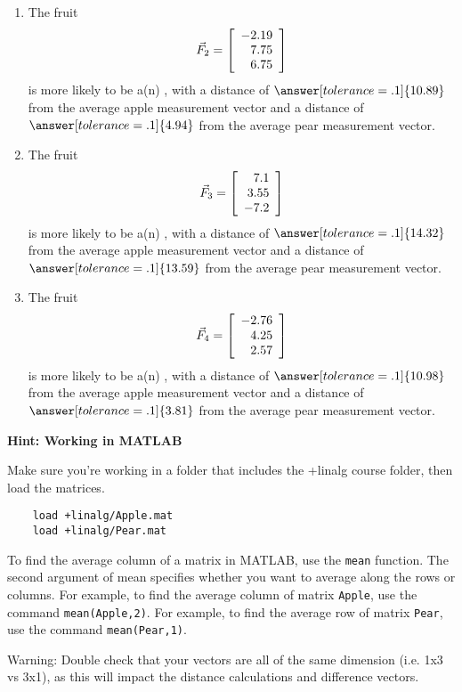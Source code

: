\documentclass{ximera}
\begin{document}
\begin{problem}
\begin{enumerate}
\item
The fruit
\begin{equation*}
  \vec{F}_2=\startmat{r}
    -2.19 \\
    7.75 \\
    6.75
  \stopmat
\end{equation*}
is more likely to be a(n) , with a distance of $\answer[tolerance=.1]{10.89}$ from the average apple measurement vector and a distance of $\answer[tolerance=.1]{4.94}$ from the average pear measurement vector.

\item
The fruit
\begin{equation*}
  \vec{F}_3=\startmat{r}
    7.1 \\
    3.55 \\
    -7.2
  \stopmat
\end{equation*}
is more likely to be a(n) , with a distance of $\answer[tolerance=.1]{14.32}$ from the average apple measurement vector and a distance of $\answer[tolerance=.1]{13.59}$ from the average pear measurement vector.

\item
The fruit
\begin{equation*}
  \vec{F}_4=\startmat{r}
    -2.76 \\
    4.25 \\
    2.57
  \stopmat
\end{equation*}
is more likely to be a(n) , with a distance of $\answer[tolerance=.1]{10.98}$ from the average apple measurement vector and a distance of $\answer[tolerance=.1]{3.81}$ from the average pear measurement vector.

\end{enumerate}

{\bf Hint: Working in MATLAB}

  Make sure you're working in a folder that includes the +linalg course folder, then load the matrices.

  \begin{verbatim}
    load +linalg/Apple.mat
    load +linalg/Pear.mat
  \end{verbatim}

  To find the average column of a matrix in MATLAB, use the \texttt{mean} function. The second argument of mean specifies whether you want to average along the rows or columns. For example, to find the average column of matrix \texttt{Apple}, use the command \texttt{mean(Apple,2)}. For example, to find the average row of matrix \texttt{Pear}, use the command \texttt{mean(Pear,1)}.

  Warning: Double check that your vectors are all of the same dimension (i.e. 1x3 vs 3x1), as this will impact the distance calculations and difference vectors.



  
\end{problem}
\end{document}
